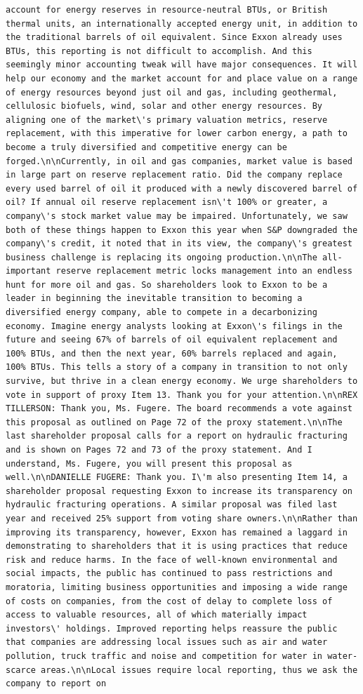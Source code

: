 \documentclass[
  letterpaper,
  DIV=11,
  numbers=noendperiod]{scrreprt}
\begin{document}
\begin{verbatim}
account for energy reserves in resource-neutral BTUs, or British thermal units, an internationally accepted energy unit, in addition to the traditional barrels of oil equivalent. Since Exxon already uses BTUs, this reporting is not difficult to accomplish. And this seemingly minor accounting tweak will have major consequences. It will help our economy and the market account for and place value on a range of energy resources beyond just oil and gas, including geothermal, cellulosic biofuels, wind, solar and other energy resources. By aligning one of the market\'s primary valuation metrics, reserve replacement, with this imperative for lower carbon energy, a path to become a truly diversified and competitive energy can be forged.\n\nCurrently, in oil and gas companies, market value is based in large part on reserve replacement ratio. Did the company replace every used barrel of oil it produced with a newly discovered barrel of oil? If annual oil reserve replacement isn\'t 100% or greater, a company\'s stock market value may be impaired. Unfortunately, we saw both of these things happen to Exxon this year when S&P downgraded the company\'s credit, it noted that in its view, the company\'s greatest business challenge is replacing its ongoing production.\n\nThe all-important reserve replacement metric locks management into an endless hunt for more oil and gas. So shareholders look to Exxon to be a leader in beginning the inevitable transition to becoming a diversified energy company, able to compete in a decarbonizing economy. Imagine energy analysts looking at Exxon\'s filings in the future and seeing 67% of barrels of oil equivalent replacement and 100% BTUs, and then the next year, 60% barrels replaced and again, 100% BTUs. This tells a story of a company in transition to not only survive, but thrive in a clean energy economy. We urge shareholders to vote in support of proxy Item 13. Thank you for your attention.\n\nREX TILLERSON: Thank you, Ms. Fugere. The board recommends a vote against this proposal as outlined on Page 72 of the proxy statement.\n\nThe last shareholder proposal calls for a report on hydraulic fracturing and is shown on Pages 72 and 73 of the proxy statement. And I understand, Ms. Fugere, you will present this proposal as well.\n\nDANIELLE FUGERE: Thank you. I\'m also presenting Item 14, a shareholder proposal requesting Exxon to increase its transparency on hydraulic fracturing operations. A similar proposal was filed last year and received 25% support from voting share owners.\n\nRather than improving its transparency, however, Exxon has remained a laggard in demonstrating to shareholders that it is using practices that reduce risk and reduce harms. In the face of well-known environmental and social impacts, the public has continued to pass restrictions and moratoria, limiting business opportunities and imposing a wide range of costs on companies, from the cost of delay to complete loss of access to valuable resources, all of which materially impact investors\' holdings. Improved reporting helps reassure the public that companies are addressing local issues such as air and water pollution, truck traffic and noise and competition for water in water-scarce areas.\n\nLocal issues require local reporting, thus we ask the company to report on 
\end{verbatim}
\end{document}
